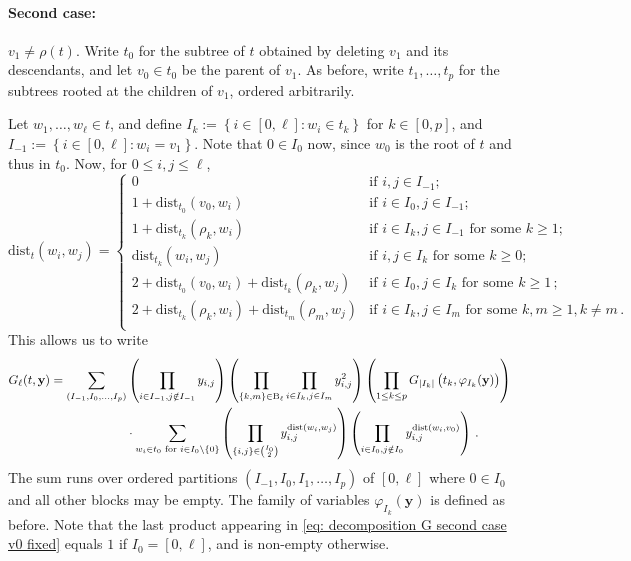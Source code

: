 \documentclass{article}
\theoremstyle{remark}
\newcommand{\abs}[1]{{\left|#1\right|}}
\newcommand{\dist}{\mathrm{dist}}
\newcommand{\pairs}{{\rm B}}
\newcommand{\by}{{\mathbf{y}}}
\begin{document}
\paragraph{Second case:}
$v_1\ne \rho(t)$.
Write $t_0$ for the subtree of $t$ obtained by deleting $v_1$ and its descendants, and let $v_0 \in t_0$ be the parent of $v_1$.
As before, write $t_1, \dots, t_p$ for the subtrees rooted at the children of $v_1$, ordered arbitrarily.

Let $w_1,\dots,w_\ell \in t$, and define $I_k := \left\{ i\in[0,\ell] : w_i\in t_k \right\}$ for $k\in[0,p]$, and $I_{-1} := \left\{ i\in[0,\ell] : w_i = v_1 \right\}$.
Note that $0\in I_0$ now, since $w_0$ is the root of $t$ and thus in $t_0$.
Now, for $0\le i,j\le \ell$,
\[
\dist_t(w_i,w_j) = 
\left\{
\begin{array}{llll}
    0 & \text{if } i,j\in I_{-1} ;\\
    1 + \dist_{t_0}(v_0,w_i) & \text{if } i\in I_0, j\in I_{-1} ;\\
    1 + \dist_{t_k}(\rho_k,w_i) & \text{if } i\in I_k, j\in I_{-1} \text{ for some } k\ge1 ;\\
    \dist_{t_k}(w_i,w_j) & \text{if } i,j\in I_k \text{ for some } k\ge0 ;\\
    2 + \dist_{t_0}(v_0,w_i) + \dist_{t_k}(\rho_k,w_j) & \text{if } i\in I_0, j\in I_k \text{ for some } k\ge1 \,;\\
    2 + \dist_{t_k}(\rho_k,w_i) + \dist_{t_m}(\rho_m,w_j) & \text{if } i\in I_k, j\in I_m \text{ for some } k,m\ge1, k \ne m \,.\\
\end{array}
\right.
\]
This allows us to write
\begin{align}\label{eq: decomposition G second case v0 fixed}
    G_\ell(t,\by) = \sum_{(I_{-1}, I_0, \dots, I_p)} &
    \left( \prod_{i\in I_{-1}, j\notin I_{-1}} y_{i,j} \right)
    \left( \prod_{\{k,m\} \in \pairs_\ell} \prod_{i\in I_k, j\in I_m} y_{i,j}^2 \right)
    \left( \prod_{1\le k\le p} G_{\abs{I_k}}\left(\big. t_k , \varphi_{I_k}(\by) \right) \right) \nonumber\\
    & \cdot \sum_{w_i\in t_0 \text{ for } i\in I_0\setminus\{0\}}
    \left( \prod_{ \{i,j\} \in \binom{I_0}{2}} y_{i,j}^{\dist(w_i,w_j)} \right)
    \left( \prod_{i\in I_0, j\notin I_0} y_{i,j}^{\dist(w_i,v_0)} \right) \,.
\end{align}
The sum runs over ordered partitions $(I_{-1}, I_0, I_1, \dots, I_p)$ of $[0,\ell]$ where $0\in I_0$ and all other blocks may be empty.
The family of variables $\varphi_{I_k}(\by)$ is defined as before.
Note that the last product appearing in \eqref{eq: decomposition G second case v0 fixed} equals $1$ if $I_0=[0,\ell]$, and is non-empty otherwise.
\end{document}
